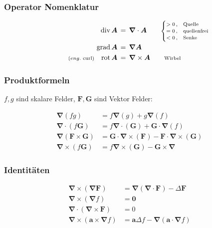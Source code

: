 \documentclass[titlepage,11pt,a4paper,ngerman]{report}
\renewcommand{\vec}[1]{\boldsymbol{#1}}
\newcommand{\vabla}{\boldsymbol{\nabla}}
\renewcommand{\paragraph}[1]{\subsubsection{#1}}
\begin{document}
\paragraph{Operator Nomenklatur}
\begin{align*}
\text{div}\, \vec{A} \, &= \, \vec{\nabla}\cdot \vec{A} \qquad \rlap{\scriptsize{$\begin{cases} 
		>0 \, , & \mathrm{Quelle} \\
		=0 \, , & \mathrm{quellenfrei}\\
		<0\, , & \mathrm{Senke}
	\end{cases}$}} \\
\text{grad}\,\vec{A} \, &= \, \vec{\nabla}\vec{A} \\
\llap{\scriptsize{($eng.$ curl)}} \quad \text{rot}\, \vec{A} \, &= \, \vec{\nabla}\times \vec{A} \qquad \rlap{\scriptsize{Wirbel}}
\end{align*}

\paragraph{Produktformeln}
$f, g$ sind skalare Felder, $\vec{F}, \vec{G}$ sind Vektor Felder:

\begin{align*}
 	\vabla(fg) &= f \vabla (g) + g \vabla (f)\\
 	\vabla \cdot (f \vec{G}) &= f \vabla \cdot (\vec{G}) + \vec{G} \cdot \vabla (f)\\
 	\vabla (\vec{F} \times \vec{G}) &= \vec{G} \cdot \vabla \times (\vec{F}) - \vec{F} \cdot \vabla \times (\vec{G})\\
 	\vabla \times (f \vec{G}) &= f \vabla \times (\vec{G}) - \vec{G} \times \vabla
\end{align*}

\paragraph{Identitäten}

\begin{align*}
	\vec{\nabla}\times(\vec{\nabla}\vec{F})&=\vec{\nabla}(\vec{\nabla}\cdot\vec{F})-\Delta\vec{F}\\
	\vec{\nabla}\times(\vec{\nabla}f)&=\vec{0}\\
	\vec{\nabla}\cdot(\vec{\nabla}\times\vec{F})&=0\\
	\vec{\nabla}\times(\vec{a}\times\vec{\nabla}f)&=\vec{a}\Delta f-\vec{\nabla}(\vec{a}\cdot\vec{\nabla}f)
\end{align*}
\end{document}
